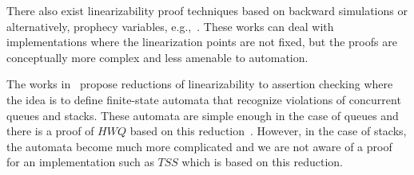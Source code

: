 There also exist linearizability proof techniques based on backward simulations or alternatively, prophecy variables, e.g.,~\cite{phd/Vafeiadis08,DBLP:conf/cav/SchellhornWD12,DBLP:conf/pldi/LiangF13}. These works can deal with implementations where the linearization points are not fixed, but the proofs are conceptually more complex and less amenable to automation.

The works in~\cite{conf/concur/HenzingerSV13,DBLP:conf/icalp/BouajjaniEEH15} propose reductions of linearizability to assertion checking where the idea is to define finite-state automata that recognize violations of concurrent queues and stacks. These automata are simple enough in the case of queues and there is a proof of $\mathit{HWQ}$ based on this reduction~\cite{conf/concur/HenzingerSV13}. However, in the case of stacks, the automata become much more complicated and we are not aware of a proof for an implementation such as $\mathit{TSS}$ which is based on this reduction.
